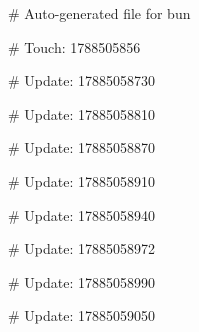 # Auto-generated file for bun

# Touch: 1788505856

# Update: 17885058730

# Update: 17885058810

# Update: 17885058870

# Update: 17885058910

# Update: 17885058940

# Update: 17885058972

# Update: 17885058990

# Update: 17885059050
